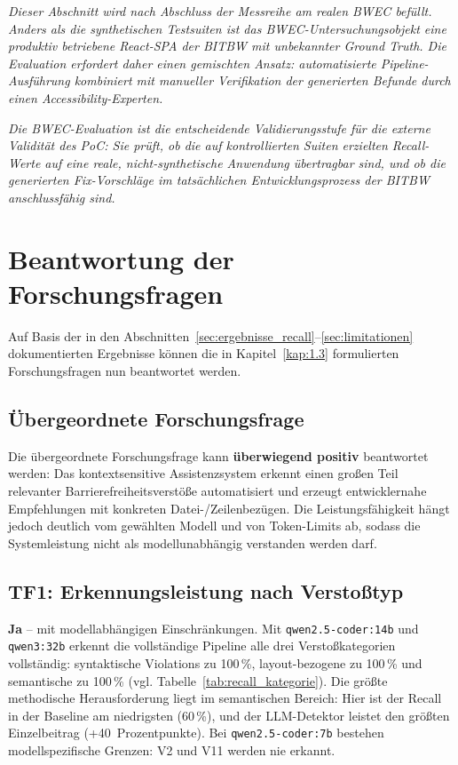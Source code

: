 \textit{Dieser Abschnitt wird nach Abschluss der Messreihe am realen \ac{BWEC} befüllt. Anders als die synthetischen Testsuiten ist das \ac{BWEC}-Untersuchungsobjekt eine produktiv betriebene React-\ac{SPA} der \ac{BITBW} mit unbekannter Ground Truth. Die Evaluation erfordert daher einen gemischten Ansatz: automatisierte Pipeline-Ausführung kombiniert mit manueller Verifikation der generierten Befunde durch einen Accessibility-Experten.}

\textit{Die \ac{BWEC}-Evaluation ist die entscheidende Validierungsstufe für die externe Validität des \ac{PoC}: Sie prüft, ob die auf kontrollierten Suiten erzielten Recall-Werte auf eine reale, nicht-synthetische Anwendung übertragbar sind, und ob die generierten Fix-Vorschläge im tatsächlichen Entwicklungsprozess der \ac{BITBW} anschlussfähig sind.}

\section{Beantwortung der Forschungsfragen}
\label{sec:ff_beantwortung}

Auf Basis der in den Abschnitten~\ref{sec:ergebnisse_recall}--\ref{sec:limitationen} dokumentierten Ergebnisse können die in Kapitel~\ref{kap:1.3} formulierten Forschungsfragen nun beantwortet werden.

\subsection{Übergeordnete Forschungsfrage}
\label{sec:ff_gesamt}

Die übergeordnete Forschungsfrage kann \textbf{überwiegend positiv} beantwortet werden: Das kontextsensitive Assistenzsystem erkennt einen großen Teil relevanter Barrierefreiheitsverstöße automatisiert und erzeugt entwicklernahe Empfehlungen mit konkreten Datei-/Zeilenbezügen. Die Leistungsfähigkeit hängt jedoch deutlich vom gewählten Modell und von Token-Limits ab, sodass die Systemleistung nicht als modellunabhängig verstanden werden darf.

\subsection{TF1: Erkennungsleistung nach Verstoßtyp}
\label{sec:ff_tf1}

\textbf{Ja} -- mit modellabhängigen Einschränkungen. Mit \texttt{qwen2.5-coder:14b} und \texttt{qwen3:32b} erkennt die vollständige Pipeline alle drei Verstoßkategorien vollständig: syntaktische Violations zu 100\,\%, layout-bezogene zu 100\,\% und semantische zu 100\,\% (vgl. Tabelle~\ref{tab:recall_kategorie}). Die größte methodische Herausforderung liegt im semantischen Bereich: Hier ist der Recall in der Baseline am niedrigsten (60\,\%), und der \ac{LLM}-Detektor leistet den größten Einzelbeitrag (+40~Prozentpunkte). Bei \texttt{qwen2.5-coder:7b} bestehen modellspezifische Grenzen: V2 und V11 werden nie erkannt.

